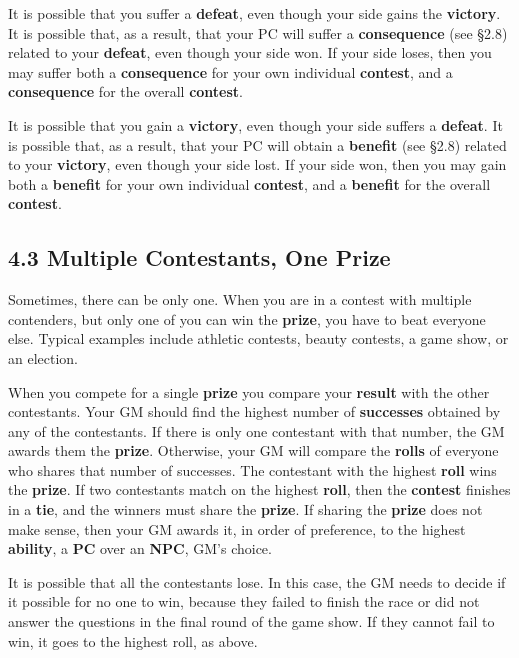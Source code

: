 \documentclass[
  11pt,
]{article}
\begin{document}
It is possible that you suffer a \textbf{defeat}, even though your side
gains the \textbf{victory}. It is possible that, as a result, that your
PC will suffer a \textbf{consequence} (see §2.8) related to your
\textbf{defeat}, even though your side won. If your side loses, then you
may suffer both a \textbf{consequence} for your own individual
\textbf{contest}, and a \textbf{consequence} for the overall
\textbf{contest}.

It is possible that you gain a \textbf{victory}, even though your side
suffers a \textbf{defeat}. It is possible that, as a result, that your
PC will obtain a \textbf{benefit} (see §2.8) related to your
\textbf{victory}, even though your side lost. If your side won, then you
may gain both a \textbf{benefit} for your own individual
\textbf{contest}, and a \textbf{benefit} for the overall
\textbf{contest}.

\hypertarget{multiple-contestants-one-prize}{%
\subsection{4.3 Multiple Contestants, One
Prize}\label{multiple-contestants-one-prize}}

Sometimes, there can be only one. When you are in a contest with
multiple contenders, but only one of you can win the \textbf{prize}, you
have to beat everyone else. Typical examples include athletic contests,
beauty contests, a game show, or an election.

When you compete for a single \textbf{prize} you compare your
\textbf{result} with the other contestants. Your GM should find the
highest number of \textbf{successes} obtained by any of the contestants.
If there is only one contestant with that number, the GM awards them the
\textbf{prize}. Otherwise, your GM will compare the \textbf{rolls} of
everyone who shares that number of successes. The contestant with the
highest \textbf{roll} wins the \textbf{prize}. If two contestants match
on the highest \textbf{roll}, then the \textbf{contest} finishes in a
\textbf{tie}, and the winners must share the \textbf{prize}. If sharing
the \textbf{prize} does not make sense, then your GM awards it, in order
of preference, to the highest \textbf{ability}, a \textbf{PC} over an
\textbf{NPC}, GM's choice.

It is possible that all the contestants lose. In this case, the GM needs
to decide if it possible for no one to win, because they failed to
finish the race or did not answer the questions in the final round of
the game show. If they cannot fail to win, it goes to the highest roll,
as above.
\end{document}
